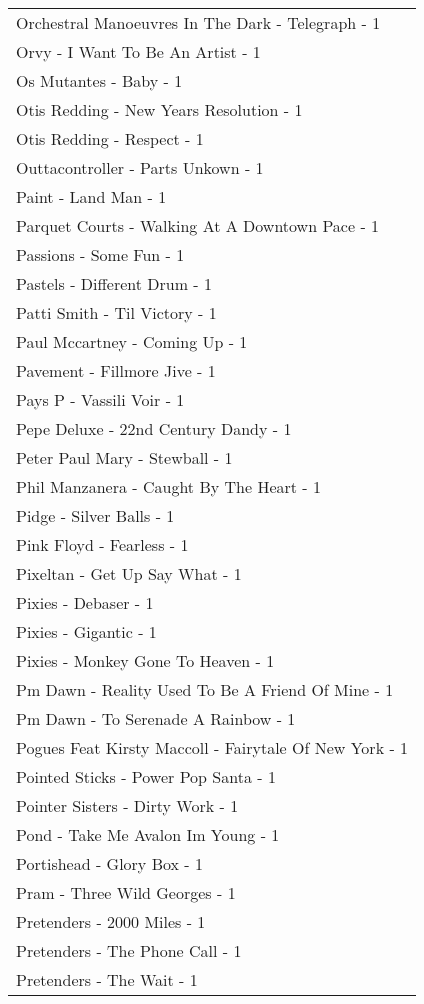 \documentclass[
]{article}
\begin{document}
\begin{longtable}{l}
Orchestral Manoeuvres In The Dark - Telegraph - 1 \\ 
Orvy - I Want To Be An Artist - 1 \\ 
Os Mutantes - Baby - 1 \\ 
Otis Redding - New Years Resolution - 1 \\ 
Otis Redding - Respect - 1 \\ 
Outtacontroller - Parts Unkown - 1 \\ 
Paint - Land Man - 1 \\ 
Parquet Courts - Walking At A Downtown Pace - 1 \\ 
Passions - Some Fun - 1 \\ 
Pastels - Different Drum - 1 \\ 
Patti Smith - Til Victory - 1 \\ 
Paul Mccartney - Coming Up - 1 \\ 
Pavement - Fillmore Jive - 1 \\ 
Pays P - Vassili Voir - 1 \\ 
Pepe Deluxe - 22nd Century Dandy - 1 \\ 
Peter Paul Mary - Stewball - 1 \\ 
Phil Manzanera - Caught By The Heart - 1 \\ 
Pidge - Silver Balls - 1 \\ 
Pink Floyd - Fearless - 1 \\ 
Pixeltan - Get Up Say What - 1 \\ 
Pixies - Debaser - 1 \\ 
Pixies - Gigantic - 1 \\ 
Pixies - Monkey Gone To Heaven - 1 \\ 
Pm Dawn - Reality Used To Be A Friend Of Mine - 1 \\ 
Pm Dawn - To Serenade A Rainbow - 1 \\ 
Pogues Feat Kirsty Maccoll - Fairytale Of New York - 1 \\ 
Pointed Sticks - Power Pop Santa - 1 \\ 
Pointer Sisters - Dirty Work - 1 \\ 
Pond - Take Me Avalon Im Young - 1 \\ 
Portishead - Glory Box - 1 \\ 
Pram - Three Wild Georges - 1 \\ 
Pretenders - 2000 Miles - 1 \\ 
Pretenders - The Phone Call - 1 \\ 
Pretenders - The Wait - 1 \\ 

\end{longtable}
\end{document}
